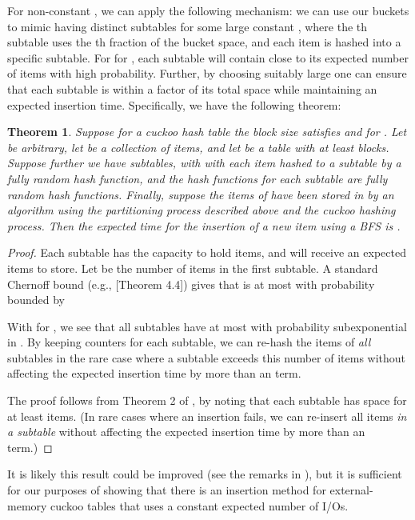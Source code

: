 \documentclass[11pt,letterpaper]{article}
\newtheorem{theorem}{Theorem}
\begin{document}
For non-constant , we can apply the following mechanism:
we can use our buckets to mimic having  distinct subtables for
some large constant , where the th subtable uses the th
fraction of the bucket space, and each item is hashed into a specific
subtable.  For  for , each subtable will contain
close to its expected number of items with high probability.  Further,
by choosing  suitably large one can ensure that each subtable is
within a  factor of its total space while maintaining an
expected  insertion
time.  Specifically, we have the following theorem:
\begin{theorem} \label{thm:cuckoo}
Suppose for a cuckoo hash table  the block size satisfies
 and  for .  Let  be
arbitrary, let  be a collection of  items, and let  be a
table with at least  blocks.  Suppose further we have
 subtables, with  with each item hashed
to a subtable by a fully random hash function, and the hash functions
for each subtable are fully random hash functions.
Finally, suppose the items of  have been stored in  by
an algorithm using the partitioning process described above and the cuckoo hashing
process.  Then the expected time for the insertion of a new item  using a BFS is
.
\end{theorem}
\begin{proof}
Each subtable has the capacity to hold  items, and will
receive an expected  items to store.  Let  be the number of items
in the first subtable.  A standard Chernoff bound 
(e.g., \cite{mu-pcrap-05}[Theorem 4.4])  gives that 
 is at most  with probability
bounded by

With  for , we see that 
all subtables have at most  with probability subexponential in .  By keeping
counters for each subtable, we can re-hash the items of {\em all} subtables in the rare case where a subtable
exceeds this number of items without affecting the expected insertion time by more than an  term.

The proof follows from Theorem 2 of \cite{dw-badtpcs-07}, by
noting that each subtable has space for at least
 items.  (In rare cases where an insertion fails,
we can re-insert all items {\em in a subtable} without affecting the expected insertion time by more than an  term.)
\end{proof}

It is likely this result could be improved
(see the remarks in \cite{dw-badtpcs-07}), but it is sufficient for
our purposes of showing that there is an insertion method for
external-memory cuckoo tables that uses a constant expected number of I/Os.
\end{document}
